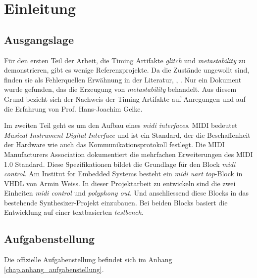 
\chapter{Einleitung}\label{chap.einleitung}


\section{Ausgangslage}\label{sect.einleitung_ausgangslage}
Für den ersten Teil der Arbeit, die Timing Artifakte  \textit{glitch} und \textit{metastability} zu demonstrieren, gibt es wenige Referenzprojekte. Da die Zustände ungewollt sind, finden sie als Fehlerquellen Erwähnung in der Literatur\cite{ReferenceManual},  \cite{F_glitches}, \cite{F_metastability}. Nur ein Dokument wurde gefunden, das die Erzeugung von \textit{ metastability} behandelt\cite{Metastabil}. Aus diesem Grund bezieht sich der Nachweis der Timing Artifakte auf Anregungen und auf die Erfahrung von Prof. Hans-Joachim Gelke.


Im zweiten Teil geht es um den Aufbau eines \textit{midi interfaces}. MIDI bedeutet \textit{Musical Instrument Digital Interface} und ist ein Standard, der die Beschaffenheit der Hardware wie auch das Kommunikationsprotokoll festlegt\cite{Midi_Braut}. Die MIDI Manufacturers Association dokumentiert die mehrfachen Erweiterungen des MIDI 1.0 Standard\cite{Midi_specification}. Diese Spezifikationen bildet die Grundlage für den Block \textit{midi control}. Am Institut for Embedded Systems besteht ein \textit{midi uart top}-Block in VHDL von Armin Weiss. In dieser Projektarbeit zu entwickeln sind die zwei Einheiten \textit{midi control}  und \textit{polyphony out}. Und anschliessend diese Blocks in das bestehende Synthesizer-Projekt einzubauen. Bei beiden Blocks basiert die Entwicklung auf einer textbasierten \textit{testbench}.



\section{Aufgabenstellung}\label{sect.einleitung_ziele}
Die offizielle Aufgabenstellung befindet sich im Anhang \ref{chap.anhang_aufgabenstellung}. 
 
